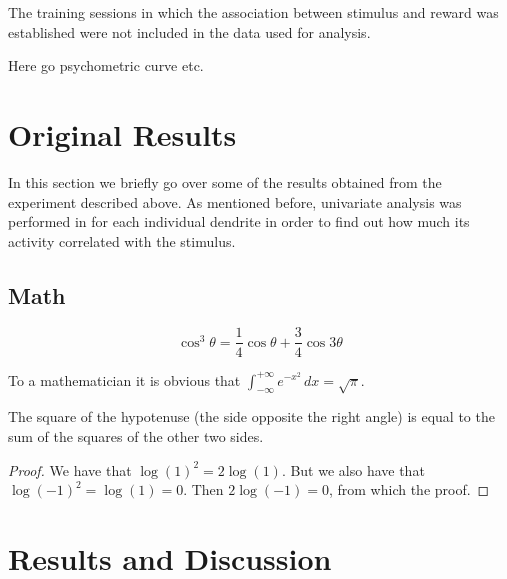 \documentclass[
10pt, %
a4paper, %
oneside, %
headinclude,footinclude, %
BCOR5mm, %
]{scrartcl}
\begin{document}
The training sessions in which the association between stimulus and reward was established were not included in the data used for analysis.

Here go psychometric curve etc.

\section{Original Results}
In this section we briefly go over some of the results obtained from the experiment described above.                                                                                                                                                                                 
As mentioned before, univariate analysis was performed in \cite{Takahashi2016} for each individual dendrite in order to find out how much its activity correlated with the stimulus. 
\subsection{Math}

\lipsum[4] %

\begin{equation}
\cos^3 \theta =\frac{1}{4}\cos\theta+\frac{3}{4}\cos 3\theta
\label{eq:refname2}
\end{equation}

\lipsum[5] %

\begin{definition}[Gauss] 
To a mathematician it is obvious that
$\int_{-\infty}^{+\infty}
e^{-x^2}\,dx=\sqrt{\pi}$. 
\end{definition} 

\begin{theorem}[Pythagoras]
The square of the hypotenuse (the side opposite the right angle) is equal to the sum of the squares of the other two sides.
\end{theorem}

\begin{proof} 
We have that $\log(1)^2 = 2\log(1)$.
But we also have that $\log(-1)^2=\log(1)=0$.
Then $2\log(-1)=0$, from which the proof.
\end{proof}


\section{Results and Discussion}
\end{document}
